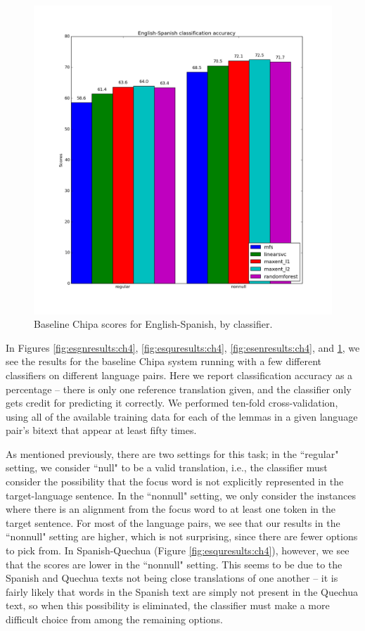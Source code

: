 \begin{figure}
  \includegraphics[width=\textwidth]{baseline-enes-ch4.png}
  \caption{Baseline Chipa scores for English-Spanish, by classifier.}
  \label{fig:enesresults:ch4}
\end{figure}

In Figures \ref{fig:esgnresults:ch4}, \ref{fig:esquresults:ch4},
\ref{fig:esenresults:ch4}, and \ref{fig:enesresults:ch4}, we see the results
for the baseline Chipa system running with a few different classifiers on
different language pairs. Here we report classification accuracy as a
percentage -- there is only one reference translation given, and the classifier
only gets credit for predicting it correctly. We performed ten-fold
cross-validation, using all of the available training data for each of the
lemmas in a given language pair's bitext that appear at least fifty times. 

As mentioned previously, there are two settings for this task; in the
``regular" setting, we consider ``null" to be a valid translation, i.e., the
classifier must consider the possibility that the focus word is not explicitly
represented in the target-language sentence. In the ``nonnull" setting, we only
consider the instances where there is an alignment from the focus word to at
least one token in the target sentence. For most of the language pairs, we see
that our results in the ``nonnull" setting are higher, which is not surprising,
since there are fewer options to pick from. In Spanish-Quechua (Figure
\ref{fig:esquresults:ch4}), however, we see
that the scores are lower in the ``nonnull" setting. This seems to be due to
the Spanish and Quechua texts not being close translations of one another -- it
is fairly likely that words in the Spanish text are simply not present in the
Quechua text, so when this possibility is eliminated, the classifier must make
a more difficult choice from among the remaining options.

